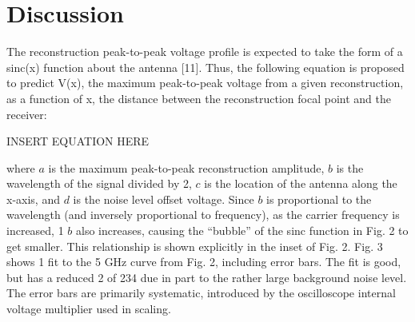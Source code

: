 \section{Discussion}
\label{sec:spatial-profile-discussion}

The reconstruction peak-to-peak voltage profile is expected to take the form of a sinc(x) function about the antenna [11]. Thus, the following equation is proposed to predict V(x), the maximum peak-to-peak voltage from a given reconstruction, as a function of x, the distance between the reconstruction focal point and the receiver:

INSERT EQUATION HERE

where $a$ is the maximum peak-to-peak reconstruction amplitude, $b$ is the wavelength of the signal divided by 2, $c$ is the location of the antenna along the x-axis, and $d$ is the noise level
offset voltage. Since $b$ is proportional to the wavelength (and inversely proportional
to frequency), as the carrier frequency is increased, 1 $b$ also increases, causing the “bubble” of the sinc function in Fig. 2 to get smaller. This relationship is shown explicitly in the inset of Fig. 2. Fig. 3 shows 1 fit to the 5 GHz curve from Fig. 2, including error bars. The fit is good, but has a reduced 2 of 234 due in part to the rather large background noise level. The error bars are primarily systematic, introduced by the oscilloscope internal voltage multiplier used in scaling.

